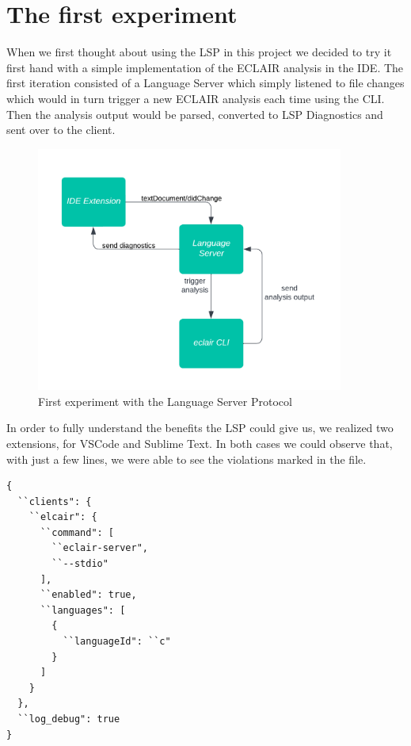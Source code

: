 \chapter{The first experiment}\label{chapter:the-first-experiment}
When we first thought about using the LSP in this project we decided to try it first hand with a simple implementation of the ECLAIR analysis in the IDE. The first iteration consisted of a Language Server which simply listened to file changes which would in turn trigger a new ECLAIR analysis each time using the CLI. Then the analysis output would be parsed, converted to LSP Diagnostics and sent over to the client. 

\begin{figure}[ht]
	\centering
	\includegraphics[width=0.9\textwidth]{Immagini/the_first_experiment_flow.jpg}
	\caption{First experiment with the Language Server Protocol}
	\label{fig:one}
\end{figure}

\clearpage

In order to fully understand the benefits the LSP could give us, we realized two extensions, for VSCode and Sublime Text. In both cases we could observe that, with just a few lines, we were able to see the violations marked in the file.

\begin{lstlisting}[caption={First Sublime Text working configuration}, label={lst:block_struct}]
{
  ``clients": {
    ``elcair": {
      ``command": [
        ``eclair-server",
        ``--stdio"
      ],
      ``enabled": true,
      ``languages": [
        {
          ``languageId": ``c"
        }
      ]
    }
  },
  ``log_debug": true
}
\end{lstlisting}

